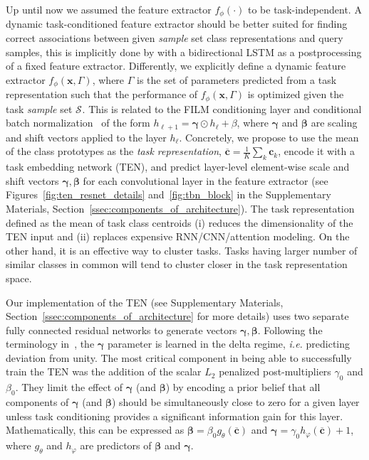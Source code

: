 \documentclass{article}
\renewcommand{\vec}[1]{\mathbf{#1}}
\newcommand{\examples}[1]{\mathcal{S}_{#1}}
\begin{document}
Up until now we assumed the feature extractor $f_{\phi}(\cdot)$ to be task-independent. A dynamic task-conditioned feature extractor should be better suited for finding correct associations between given \emph{sample} set class representations and query samples, this is implicitly done by \citet{vinyals2016matching} with a bidirectional LSTM as a postprocessing of a fixed feature extractor. Differently, we explicitly define a dynamic feature extractor $f_{\phi}(\vec{x}, \Gamma)$, where $\Gamma$ is the set of parameters predicted from a task representation such that the performance of $f_{\phi}(\vec{x}, \Gamma)$ is optimized given the task \emph{sample} set $\examples{}$. This is related to the FILM conditioning layer \citep{perez2017film} and conditional batch normalization~\citep{Dumoulin2017learned,Perez2017LearningVR} of the form $h_{\ell+1} = \bm{\gamma} \odot h_{\ell} + \beta$, where $\bm{\gamma}$ and $\bm{\beta}$ are scaling and shift vectors applied to the layer $h_{\ell}$. Concretely, we propose to use the mean of the class prototypes as the \emph{task representation}, $\overline{\vec{c}} = \frac{1}{K}\sum_k \vec{c}_k$, encode it with a task embedding network (TEN), and predict layer-level element-wise scale and shift vectors $\bm{\gamma}, \bm{\beta}$ for each convolutional layer in the feature extractor (see Figures~\ref{fig:ten_resnet_details} and~\ref{fig:tbn_block} in the Supplementary Materials, Section~\ref{ssec:components_of_architecture}). The task representation defined as the mean of task class centroids (i) reduces the dimensionality of the TEN input and (ii) replaces expensive RNN/CNN/attention modeling. On the other hand, it is an effective way to cluster tasks. Tasks having larger number of similar classes in common will tend to cluster closer in the task representation space.
 
Our implementation of the TEN (see Supplementary Materials, Section~\ref{ssec:components_of_architecture} for more details) uses two separate fully connected residual networks to generate vectors $\bm{\gamma}, \bm{\beta}$. Following the terminology in~\citep{Perez2017LearningVR}, the $\bm{\gamma}$ parameter is learned in the delta regime, \emph{i.e.} predicting deviation from unity. The most critical component in being able to successfully train the TEN was the addition of the scalar $L_2$ penalized post-multipliers $\gamma_0$ and $\beta_0$. They limit the effect of $\bm{\gamma}$ (and $\bm{\beta}$) by encoding a prior belief that all components of $\bm{\gamma}$  (and $\bm{\beta}$) should be simultaneously close to zero for a given layer unless task conditioning provides a significant information gain for this layer. Mathematically, this can be expressed as $\bm{\beta} = \beta_0 g_{\theta}(\overline{\vec{c}})$ and $\bm{\gamma} = \gamma_0 h_{\varphi}(\overline{\vec{c}}) + 1$, where $g_{\theta}$ and $h_{\varphi}$ are predictors of $\bm{\beta}$ and $\bm{\gamma}$.
\end{document}
